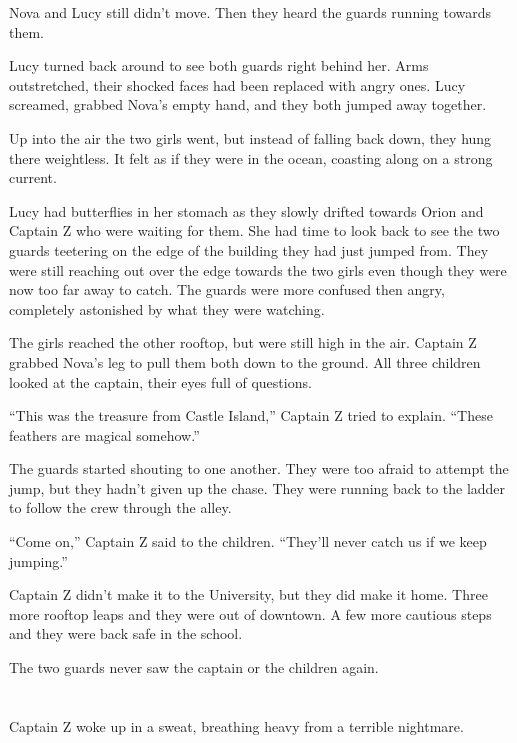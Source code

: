 \documentclass[12pt]{extbook}
\begin{document}
  Nova and Lucy still didn't move. Then they heard the guards running
  towards them.
  
  Lucy turned back around to see both guards right behind her. Arms
  outstretched, their shocked faces had been replaced with angry ones.
  Lucy screamed, grabbed Nova's empty hand, and they both jumped away
  together.
  
  Up into the air the two girls went, but instead of falling back down,
  they hung there weightless. It felt as if they were in the ocean,
  coasting along on a strong current.
  
  Lucy had butterflies in her stomach as they slowly drifted towards Orion
  and Captain Z who were waiting for them. She had time to look back to
  see the two guards teetering on the edge of the building they had just
  jumped from. They were still reaching out over the edge towards the two
  girls even though they were now too far away to catch. The guards were
  more confused then angry, completely astonished by what they were
  watching.
  
  The girls reached the other rooftop, but were still high in the air.
  Captain Z grabbed Nova's leg to pull them both down to the ground. All
  three children looked at the captain, their eyes full of questions.
  
  \enquote{This was the treasure from Castle Island,} Captain Z tried to
  explain. \enquote{These feathers are magical somehow.}
  
  The guards started shouting to one another. They were too afraid to
  attempt the jump, but they hadn't given up the chase. They were running
  back to the ladder to follow the crew through the alley.
  
  \enquote{Come on,} Captain Z said to the children. \enquote{They'll
  never catch us if we keep jumping.}
  
  Captain Z didn't make it to the University, but they did make it home.
  Three more rooftop leaps and they were out of downtown. A few more
  cautious steps and they were back safe in the school.
  
  The two guards never saw the captain or the children again.
  
  \section{}\label{section-35}
  
  Captain Z woke up in a sweat, breathing heavy from a terrible nightmare.
  
\end{document}
